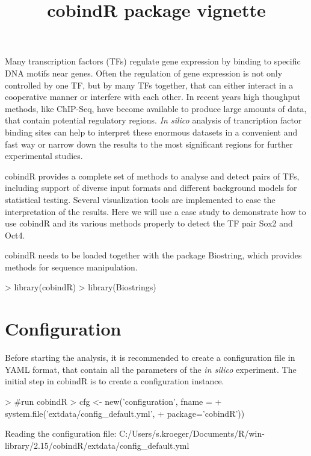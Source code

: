\documentclass{article}
\begin{document}



\title{cobindR package vignette}
\maketitle
Many transcription factors (TFs) regulate gene expression by binding to specific DNA motifs near genes. Often the regulation of gene expression is not only controlled by one TF, but by many TFs together, that can either interact in a cooperative manner or interfere with each other. In recent years high thoughput methods, like ChIP-Seq, have become available to produce large amounts of data, that contain potential regulatory regions. \textit{In silico} analysis of trancription factor binding sites can help to interpret these enormous datasets in a convenient and fast way or narrow down the results to the most significant regions for further experimental studies.

cobindR provides a complete set of methods to analyse and detect pairs of TFs, including support of diverse input formats and different background models for statistical testing. Several visualization tools are implemented to ease the interpretation of the results. Here we will use a case study to demonstrate how to use cobindR and its various methods properly to detect the TF pair Sox2 and Oct4.

cobindR needs to be loaded together with the package Biostring, which provides methods for sequence manipulation.

\begin{Schunk}
\begin{Sinput}
> library(cobindR)
> library(Biostrings)
\end{Sinput}
\end{Schunk}

\section{Configuration}
Before starting the analysis, it is recommended to create a configuration file in YAML format, that contain all the parameters of the \textit{in silico} experiment. The initial step in cobindR is to create a configuration instance.

\begin{Schunk}
\begin{Sinput}
> #run cobindR
> cfg <- new('configuration', fname = 
+              system.file('extdata/config_default.yml',
+              package='cobindR'))
\end{Sinput}
\begin{Soutput}
Reading the configuration file:  C:/Users/s.kroeger/Documents/R/win-library/2.15/cobindR/extdata/config_default.yml 
\end{Soutput}
\end{Schunk}
\end{document}
